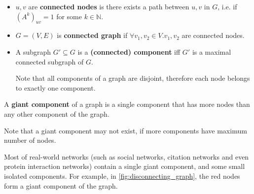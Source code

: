 \begin{definition}[Connectedness]
    \begin{itemize}[leftmargin=*]
        \item $u, v$ are \textbf{connected nodes} is there exists a path between $u, v$ in $G$, i.e. if $(A^k)_{uv} = 1$ for some $k\in \mathbb{N}$.
        \item $G = (V, E)$ is \textbf{connected graph} if $\forall v_1, v_2 \in V. v_1, v_2$ are connected nodes.
        \item A subgraph $G' \subseteq G$ is a \textbf{(connected) component} iff $G'$ is a maximal connected subgraph of $G$.

        Note that all components of a graph are disjoint, therefore each node belongs to exactly one component.
    \end{itemize}

    \item A \textbf{giant component} of a graph is a single component that has more nodes than any other component of the graph.

    Note that a giant component may not exist, if more components have maximum number of nodes.
\end{definition}



Most of real-world networks (such as social networks, citation networks and even protein interaction networks) contain a single giant component, and some small isolated components.
For example, in \autoref{fig:disconnecting_graph}, the red nodes form a giant component of the graph.


